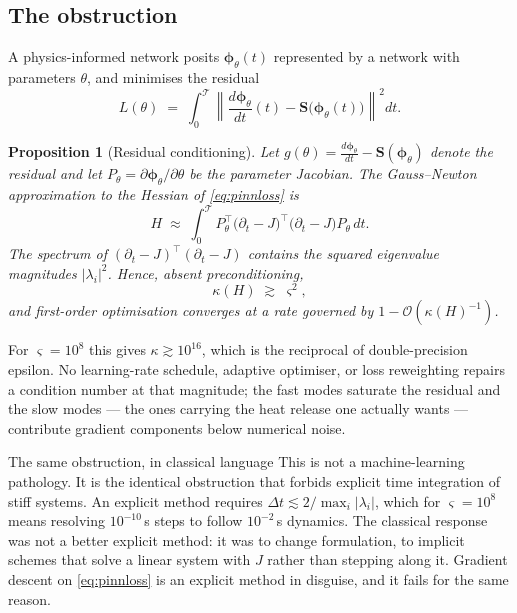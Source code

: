 \documentclass[11pt]{article}
\newcommand{\vv}[1]{\bm{#1}}
\newcommand{\phiv}{\vv{\phi}}
\newcommand{\Sv}{\vv{S}}
\newcommand{\dt}{\Delta t}
\theoremstyle{plain}
\newtheorem{proposition}[theorem]{Proposition}
\theoremstyle{definition}
\begin{document}
\subsection{The obstruction}

A physics-informed network posits $\phiv_\theta(t)$ represented by a network
with parameters $\theta$, and minimises the residual
\begin{equation}
L(\theta) \;=\; \int_0^{\mathcal{T}}
  \left\| \frac{d\phiv_\theta}{dt}(t) - \Sv\big(\phiv_\theta(t)\big) \right\|^2 dt .
\label{eq:pinnloss}
\end{equation}

\begin{proposition}[Residual conditioning]
\label{prop:cond}
Let $g(\theta) = \tfrac{d\phiv_\theta}{dt} - \Sv(\phiv_\theta)$ denote the
residual and let $P_\theta = \partial\phiv_\theta/\partial\theta$ be the
parameter Jacobian. The Gauss--Newton approximation to the Hessian of
\eqref{eq:pinnloss} is
\begin{equation}
H \;\approx\; \int_0^{\mathcal{T}}
  P_\theta^{\!\top}\big(\partial_t - J\big)^{\!\top}\big(\partial_t - J\big) P_\theta \, dt .
\end{equation}
The spectrum of $(\partial_t - J)^{\!\top}(\partial_t - J)$ contains the squared
eigenvalue magnitudes $|\lambda_i|^2$. Hence, absent preconditioning,
\begin{equation}
\kappa(H) \;\gtrsim\; \varsigma^2 ,
\end{equation}
and first-order optimisation converges at a rate governed by
$1 - \mathcal{O}(\kappa(H)^{-1})$.
\end{proposition}

For $\varsigma = 10^8$ this gives $\kappa \gtrsim 10^{16}$, which is the
reciprocal of double-precision epsilon. No learning-rate schedule, adaptive
optimiser, or loss reweighting repairs a condition number at that magnitude;
the fast modes saturate the residual and the slow modes --- the ones carrying
the heat release one actually wants --- contribute gradient components below
numerical noise.

\begin{engbox}{The same obstruction, in classical language}
This is not a machine-learning pathology. It is the identical obstruction that
forbids explicit time integration of stiff systems. An explicit method requires
$\dt \lesssim 2/\max_i|\lambda_i|$, which for $\varsigma=10^{8}$ means resolving
$10^{-10}\,$s steps to follow $10^{-2}\,$s dynamics. The classical response was
not a better explicit method: it was to change formulation, to implicit schemes
that solve a linear system with $J$ rather than stepping along it. Gradient
descent on \eqref{eq:pinnloss} is an explicit method in disguise, and it fails
for the same reason.
\end{engbox}
\end{document}

